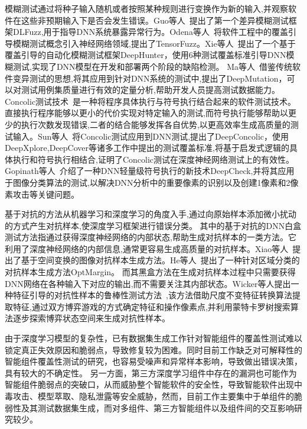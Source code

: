 模糊测试通过将种子输入随机或者按照某种规则进行变换作为新的输入,并观察软件在这些非预期输入下是否会发生错误。Guo等人~提出了第一个差异模糊测试框架DLFuzz,用于指导DNN系统暴露异常行为。Odena等人~将软件工程中的覆盖引导模糊测试概念引入神经网络领域,提出了TensorFuzz。Xie等人~提出了一个基于覆盖引导的自动化模糊测试框架DeepHunter，使用6种测试覆盖标准引导DNN模糊测试,实现了DNN模型在开发和部署两个阶段的缺陷检测。
Ma等人~借鉴传统软件变异测试的思想,将其应用到针对DNN系统的测试中,提出了DeepMutation，可以对测试用例集质量进行有效的定量分析,帮助开发人员提高测试数据能力。
Concolic测试技术~\cite{Majumdar2007Hybrid}是一种将程序具体执行与符号执行结合起来的软件测试技术。直接执行程序能够以更小的代价实现对特定输入的测试,而符号执行能够帮助以更少的执行次数发现错误,二者的结合能够发挥各自优势,以更高效率生成高质量的测试输入。Sun等人~将Concolic测试应用到DNN测试,提出了DeepConcolic，使用DeepXplore,DeepCover等诸多工作中提出的测试覆盖标准,将基于启发式逻辑的具体执行和符号执行相结合,证明了Concolic测试在深度神经网络测试上的有效性。Gopinath等人~介绍了一种DNN轻量级符号执行的新技术DeepCheck,并将其应用于图像分类算法的测试,以解决DNN分析中的重要像素的识别以及创建1像素和2像素攻击等关键问题。


基于对抗的方法从机器学习和深度学习的角度入手,通过向原始样本添加微小扰动的方式产生对抗样本,使深度学习框架进行错误分类。
其中的基于对抗的DNN白盒测试方法指通过获得深度神经网络的内部状态,帮助生成对抗样本的一类方法。它利用了深度神经网络的内部信息,通常更容易生成高质量的对抗样本。Xiao等人~提出了基于空间变换的图像对抗样本生成方法。He等人~提出了一种针对区域分类的对抗样本生成方法OptMargin。
而其黑盒方法在生成对抗样本过程中只需要获得DNN网络在各种输入下对应的输出,而不需要关注其内部状态。Wicker等人提出一种特征引导的对抗性样本的鲁棒性测试方法~,该方法借助尺度不变特征转换算法提取特征,通过双方博弈游戏的方式确定特征和操作像素点,并利用蒙特卡罗树搜索算法逐步探索博弈状态空间来生成对抗性样本。


由于深度学习模型的复杂性，已有数据集生成工作针对智能组件的覆盖性测试难以锁定真正失效原因和脆弱点，导致修复较为困难。同时目前工作缺乏对可解释性的智能组件覆盖性测试的研究，也容易受噪声和异常样本影响，导致做出错误决策，具有较大的不确定性。
另一方面，第三方深度学习组件中存在的漏洞也可能作为智能组件脆弱点的突破口，从而威胁整个智能软件的安全性，导致智能软件出现中毒攻击、模型萃取、隐私泄露等安全威胁，然而，目前工作主要集中于单组件的脆弱性及其测试数据集生成，而对多组件、第三方智能组件以及组件间的交互影响研究较少。



